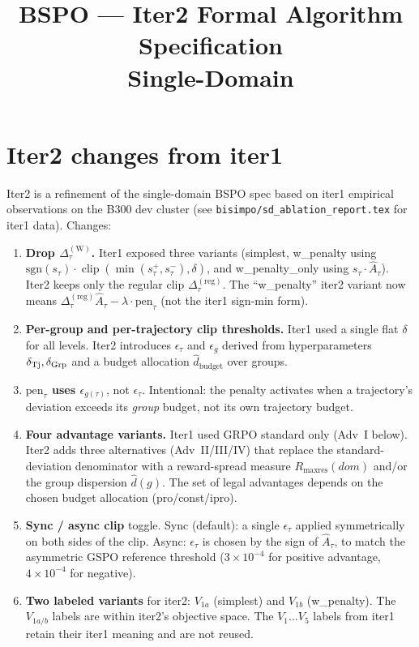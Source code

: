 \documentclass[11pt]{article}
\title{BSPO --- Iter2 Formal Algorithm Specification\\Single-Domain}
\author{}
\date{}
\DeclareMathOperator*{\clip}{clip}
\newcommand{\dbudget}{\hat d_{\text{budget}}}
\begin{document}
\maketitle

\section{Iter2 changes from iter1}

Iter2 is a refinement of the single-domain BSPO spec based on iter1
empirical observations on the B300 dev cluster (see
\texttt{bisimpo/sd\_ablation\_report.tex} for iter1 data). Changes:

\begin{enumerate}[label=(\alph*)]
\item \textbf{Drop $\Delta_\tau^{(\mathrm W)}$.} Iter1 exposed three
  variants (simplest, w\_penalty using $\mathrm{sgn}(s_\tau)\cdot
  \clip(\min(s_\tau^+,s_\tau^-),\delta)$, and w\_penalty\_only using
  $s_\tau\cdot\hat A_\tau$). Iter2 keeps only the regular clip
  $\Delta_\tau^{(\mathrm{reg})}$. The ``w\_penalty'' iter2 variant now
  means $\Delta_\tau^{(\mathrm{reg})}\hat A_\tau - \lambda\cdot\mathrm{pen}_\tau$
  (not the iter1 sign-min form).
\item \textbf{Per-group and per-trajectory clip thresholds.} Iter1 used
  a single flat $\delta$ for all levels. Iter2 introduces
  $\epsilon_\tau$ and $\epsilon_g$ derived from hyperparameters
  $\delta_{\rm Tj}, \delta_{\rm Grp}$ and a budget allocation
  $\dbudget$ over groups.
\item \textbf{$\mathrm{pen}_\tau$ uses $\epsilon_{g(\tau)}$}, not
  $\epsilon_\tau$. Intentional: the penalty activates when a
  trajectory's deviation exceeds its \emph{group} budget, not its own
  trajectory budget.
\item \textbf{Four advantage variants.} Iter1 used GRPO standard only
  (Adv~I below). Iter2 adds three alternatives (Adv~II/III/IV) that
  replace the standard-deviation denominator with a reward-spread
  measure $R_{\max\text{res}}(dom)$ and/or the group dispersion
  $\hat d(g)$. The set of legal advantages depends on the chosen
  budget allocation (pro/const/ipro).
\item \textbf{Sync / async clip} toggle. Sync (default): a single
  $\epsilon_\tau$ applied symmetrically on both sides of the clip.
  Async: $\epsilon_\tau$ is chosen by the sign of $\hat A_\tau$, to
  match the asymmetric GSPO reference threshold
  ($3\!\times\!10^{-4}$ for positive advantage,
  $4\!\times\!10^{-4}$ for negative).
\item \textbf{Two labeled variants} for iter2: $V_{1a}$ (simplest) and
  $V_{1b}$ (w\_penalty). The $V_{1a/b}$ labels are within iter2's
  objective space. The $V_1\ldots V_5$ labels from iter1 retain
  their iter1 meaning and are not reused.
\end{enumerate}
\end{document}
